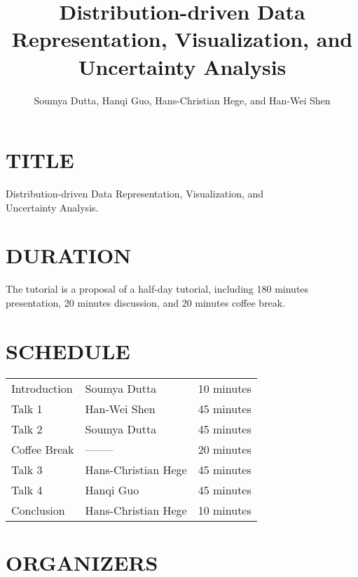 \documentclass[preprint,journal]{vgtc}       %
\title{Distribution-driven Data Representation, Visualization, and \\ Uncertainty Analysis}
\author{Soumya Dutta, Hanqi Guo, Hans-Christian Hege, and Han-Wei Shen}
\begin{document}


\maketitle

\section*{TITLE}
Distribution-driven Data Representation, Visualization, and \\ Uncertainty Analysis.

\section*{DURATION}
The tutorial is a proposal of a half-day tutorial, including 180 minutes presentation, 20 minutes discussion, and 20 minutes coffee break.

\section*{SCHEDULE}

\vspace{-0.1in}
\begin{table}[H]
\begin{tabular}{lll}
Introduction & Soumya Dutta & 10 minutes\\
Talk 1 & Han-Wei Shen & 45 minutes\\
Talk 2 & Soumya Dutta & 45 minutes\\
Coffee Break & -------- & 20 minutes\\
Talk 3 & Hans-Christian Hege & 45 minutes\\
Talk 4 & Hanqi Guo & 45 minutes\\
Conclusion & Hans-Christian Hege & 10 minutes
\end{tabular}
\end{table}

\section*{ORGANIZERS}
\end{document}
